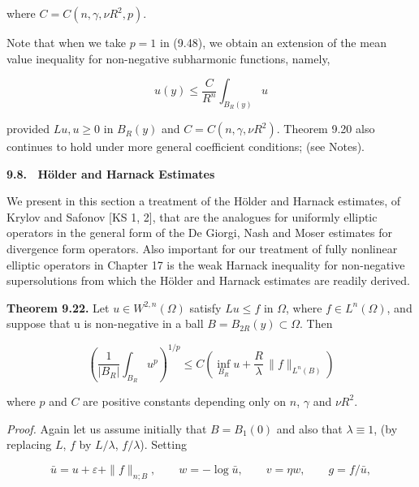 \noindent where $C=C(n,\gamma,\nu R^2,p)$.

\medskip

Note that when we take $p=1$ in (9.48), we obtain an extension of the mean value
inequality for non-negative subharmonic functions, namely,

\begin{equation}\tag{9.51}
u(y)\le \frac{C}{R^n}\int_{B_R(y)}u
\end{equation}

\noindent provided $Lu,u\ge 0$ in $B_R(y)$ and $C=C(n,\gamma,\nu R^2)$.
Theorem 9.20 also continues to hold under more general coefficient conditions;
(see Notes).

\bigskip

\noindent\textbf{9.8. \ Hölder and Harnack Estimates}

\medskip

We present in this section a treatment of the H\"older and Harnack estimates, of
Krylov and Safonov [KS 1, 2], that are the analogues for uniformly elliptic
operators in the general form of the De Giorgi, Nash and Moser estimates for
divergence form operators. Also important for our treatment of fully nonlinear
elliptic operators in Chapter 17 is the weak Harnack inequality for non-negative
supersolutions from which the H\"older and Harnack estimates are readily derived.

\medskip

\noindent\textbf{Theorem 9.22.}
Let $u\in W^{2,n}(\Omega)$ satisfy $Lu\le f$ in $\Omega$, where $f\in L^n(\Omega)$, and suppose
that u is non-negative in a ball $B=B_{2R}(y)\subset\Omega$. Then

\begin{equation}\tag{9.52}
\left(\frac{1}{|B_R|}\int_{B_R}u^p\right)^{1/p}\le C\left(\inf_{B_R}u+\frac{R}{\lambda}\,\|f\|_{L^n(B)}\right)
\end{equation}

\noindent where $p$ and $C$ are positive constants depending only on $n$, $\gamma$ and $\nu R^2$.

\medskip

\noindent\textit{Proof.} Again let us assume initially that $B=B_1(0)$ and also that $\lambda\equiv 1$, (by replacing $L$, $f$ by $L/\lambda$, $f/\lambda$). Setting

\begin{equation}\tag{9.53}
\bar u=u+\varepsilon+\|f\|_{n;B},\qquad
w=-\log \bar u,\qquad v=\eta w,\qquad g=f/\bar u,
\end{equation}


